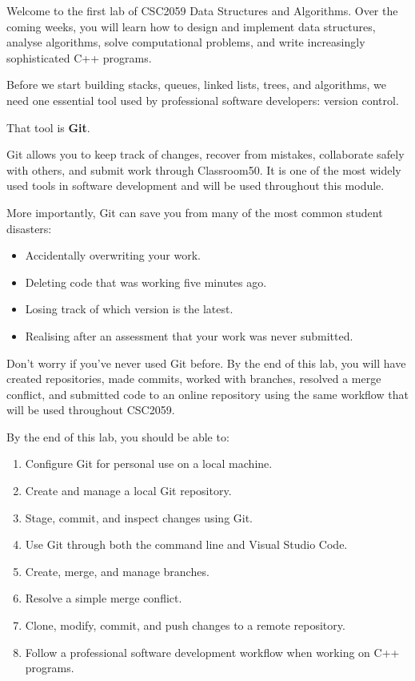 \documentclass{csc2059practical}
\begin{document}
\maketitle
\tableofcontents
\clearpage
{}
Welcome to the first lab of CSC2059 Data Structures and Algorithms. Over the coming weeks, you will learn how to design and implement data structures, analyse algorithms, solve computational problems, and write increasingly sophisticated C++ programs.

Before we start building stacks, queues, linked lists, trees, and algorithms, we need one essential tool used by professional software developers: version control.

That tool is \textbf{Git}.

Git allows you to keep track of changes, recover from mistakes, collaborate safely with others, and submit work through Classroom50. It is one of the most widely used tools in software development and will be used throughout this module.

More importantly, Git can save you from many of the most common student disasters:

\begin{itemize}
  \item Accidentally overwriting your work.
  \item Deleting code that was working five minutes ago.
  \item Losing track of which version is the latest.
  \item Realising after an assessment that your work was never submitted.
\end{itemize}
Don't worry if you've never used Git before. By the end of this lab, you will have created repositories, made commits, worked with branches, resolved a merge conflict, and submitted code to an online repository using the same workflow that will be used throughout CSC2059.

\begin{learningoutcomes}
By the end of this lab, you should be able to:

\begin{enumerate}
  \item Configure Git for personal use on a local machine.
  \item Create and manage a local Git repository.
  \item Stage, commit, and inspect changes using Git.
  \item Use Git through both the command line and Visual Studio Code.
  \item Create, merge, and manage branches.
  \item Resolve a simple merge conflict.
  \item Clone, modify, commit, and push changes to a remote repository.
  \item Follow a professional software development workflow when working on C++ programs.
\end{enumerate}
\end{learningoutcomes}
\end{document}

